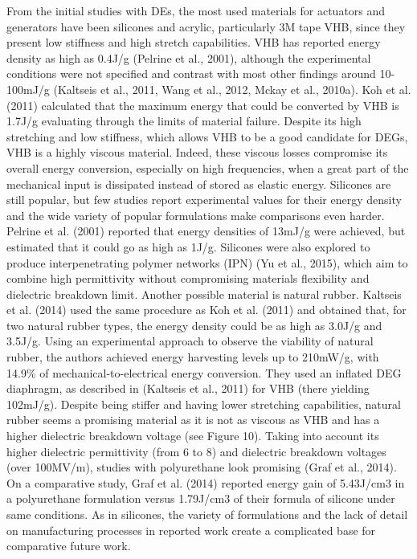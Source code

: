	From the initial studies with DEs, the most used materials for actuators and generators have been silicones and acrylic, particularly 3M tape VHB, since they present low stiffness and high stretch capabilities. VHB has reported energy density as high as 0.4J/g (Pelrine et al., 2001), although the experimental conditions were not specified and contrast with most other findings around 10-100mJ/g (Kaltseis et al., 2011, Wang et al., 2012, Mckay et al., 2010a). Koh et al. (2011) calculated that the maximum energy that could be converted by VHB is 1.7J/g evaluating through the limits of material failure. Despite its high stretching and low stiffness, which allows VHB to be a good candidate for DEGs, VHB is a highly viscous material. Indeed, these viscous losses compromise its overall energy conversion, especially on high frequencies, when a great part of the mechanical input is dissipated instead of stored as elastic energy. 
Silicones are still popular, but few studies report experimental values for their energy density and the wide variety of popular formulations make comparisons even harder. Pelrine et al. (2001) reported that energy densities of 13mJ/g were achieved, but estimated that it could go as high as 1J/g. Silicones were also explored to produce interpenetrating polymer networks (IPN) (Yu et al., 2015), which aim to combine high permittivity without compromising materials flexibility and dielectric breakdown limit. 
Another possible material is natural rubber. Kaltseis et al. (2014) used the same procedure as Koh et al. (2011) and obtained that, for two natural rubber types, the energy density could be as high as 3.0J/g and 3.5J/g. Using an experimental approach to observe the viability of natural rubber, the authors achieved energy harvesting levels up to 210mW/g, with 14.9\% of mechanical-to-electrical energy conversion. They used an inflated DEG diaphragm, as described in (Kaltseis et al., 2011) for VHB (there yielding 102mJ/g). Despite being stiffer and having lower stretching capabilities, natural rubber seems a promising material as it is not as viscous as VHB and has a higher dielectric breakdown voltage (see Figure 10). 
	Taking into account its higher dielectric permittivity (from 6 to 8) and dielectric breakdown voltages (over 100MV/m), studies with polyurethane look promising (Graf et al., 2014). On a comparative study, Graf et al. (2014) reported energy gain of 5.43J/cm3 in a polyurethane formulation versus 1.79J/cm3 of their formula of silicone under same conditions. As in silicones, the variety of formulations and the lack of detail on manufacturing processes in reported work create a complicated base for comparative future work.
